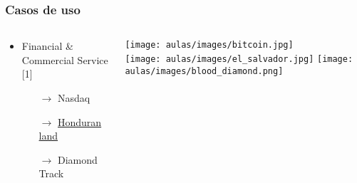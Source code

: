 \documentclass{beamer}
\begin{document}
\begin{frame}
\frametitle{Casos de uso}

\begin{columns}[T]
    \begin{column}{0.7\textwidth}
    \begin{itemize}
        \item Financial \& Commercial Service [1]
        \begin{itemize}
            \item [$\rightarrow$] Nasdaq
            \item [$\rightarrow$] \href{https://www.oecd.org/corruption/integrity-forum/academic-papers/Georg\%20Eder-\%20Blockchain\%20-\%20Ghana_verified.pdf}{Honduran land}
            \item [$\rightarrow$] Diamond Track
        \end{itemize}
    \end{itemize}
    \end{column}
    \begin{column}{0.25\textwidth}
        \texttt{[image: aulas/images/bitcoin.jpg]}\\
        \vspace{0.5cm}
        \texttt{[image: aulas/images/el\_salvador.jpg]}
        \vspace{0.5cm}
        \texttt{[image: aulas/images/blood\_diamond.png]}
    \end{column}
\end{columns}
\end{frame}
\end{document}
